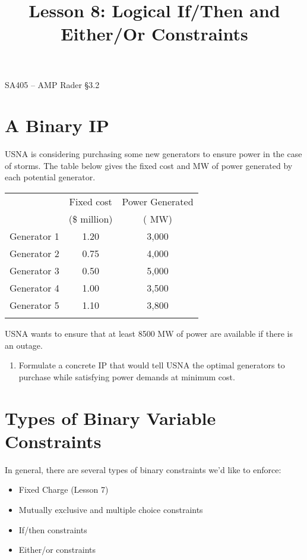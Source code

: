 \documentclass[11pt]{article}
\makeatletter
\theoremstyle{definition}
\renewcommand{\maketitle}{
  \noindent SA405 -- AMP \hfill Rader \S 3.2 \\

  \begin{center}\Large{\textbf{\@title}}\end{center}
}
\makeatother
\begin{document}
  
\title{Lesson 8: Logical If/Then and Either/Or Constraints}

\maketitle


\section{A Binary IP}

USNA is considering purchasing some new generators to ensure power in the case of storms. The table below gives the fixed cost and MW of power generated by each potential generator.

\begin{center}
\begin{tabular}{lcc} 
\hline 
 & Fixed cost & Power Generated \\
 & (\$ million) & ( MW) \\
\hline 
 Generator 1 & 1.20 & 3,000 \\ 
 Generator 2 & 0.75 & 4,000 \\ 
 Generator 3 & 0.50 & 5,000 \\ 
 Generator 4 & 1.00 & 3,500 \\
 Generator 5 & 1.10 & 3,800 \\
 \hline \\ 
\end{tabular}
\end{center}

USNA wants to ensure that at least 8500 MW of power are available if there is an outage. 

\begin{enumerate}
\item Formulate a concrete IP that would tell USNA the optimal generators to purchase while satisfying power demands at minimum cost.
\end{enumerate}

\newpage

\section{Types of Binary Variable Constraints}

In general, there are several types of binary constraints we'd like to enforce:
\begin{itemize}
\item Fixed Charge (Lesson 7)
\item Mutually exclusive and multiple choice constraints
\item If/then constraints
\item Either/or constraints
\end{itemize}
\end{document}
